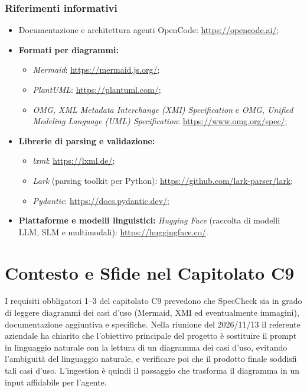 \documentclass[a4paper, 11pt]{article}
\begin{document}
\subsubsection{Riferimenti informativi}
\begin{itemize}[noitemsep]
    \item Documentazione e architettura agenti OpenCode: \url{https://opencode.ai/};
    \item \textbf{Formati per diagrammi:}
        \begin{itemize}[noitemsep]
            \item \textit{Mermaid}: \url{https://mermaid.js.org/};
            \item \textit{PlantUML}: \url{https://plantuml.com/};
            \item \textit{OMG, XML Metadata Interchange (XMI) Specification} e \textit{OMG, Unified Modeling Language (UML) Specification}: \url{https://www.omg.org/spec/};
        \end{itemize}
    \item \textbf{Librerie di parsing e validazione:}
        \begin{itemize}[noitemsep]
            \item \textit{lxml}: \url{https://lxml.de/};
            \item \textit{Lark} (parsing toolkit per Python): \url{https://github.com/lark-parser/lark};
            \item \textit{Pydantic}: \url{https://docs.pydantic.dev/};
        \end{itemize}
    \item \textbf{Piattaforme e modelli linguistici:} \textit{Hugging Face} (raccolta di modelli LLM, SLM e multimodali): \url{https://huggingface.co/}.
\end{itemize}

\section{Contesto e Sfide nel Capitolato C9}
I requisiti obbligatori 1--3 del capitolato C9 prevedono che SpecCheck sia in grado di leggere diagrammi dei casi d'uso (Mermaid, XMI ed eventualmente immagini), documentazione aggiuntiva e specifiche. Nella riunione del 2026/11/13 il referente aziendale ha chiarito che l'obiettivo principale del progetto è sostituire il prompt in linguaggio naturale con la lettura di un diagramma dei casi d'uso, evitando l'ambiguità del linguaggio naturale, e verificare poi che il prodotto finale soddisfi tali casi d'uso. L'ingestion è quindi il passaggio che trasforma il diagramma in un input affidabile per l'agente.
\end{document}
